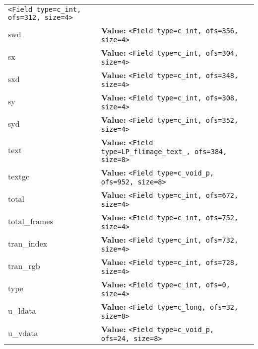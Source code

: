 \begin{longtable}{|p{\varnamewidth}|p{\vardescrwidth}|l}
{\tt {\textless}Field type=c\_int, ofs=312, size=4{\textgreater}}&\\
\cline{1-2}
\raggedright s\-w\-d\- & \raggedright \textbf{Value:} 
{\tt {\textless}Field type=c\_int, ofs=356, size=4{\textgreater}}&\\
\cline{1-2}
\raggedright s\-x\- & \raggedright \textbf{Value:} 
{\tt {\textless}Field type=c\_int, ofs=304, size=4{\textgreater}}&\\
\cline{1-2}
\raggedright s\-x\-d\- & \raggedright \textbf{Value:} 
{\tt {\textless}Field type=c\_int, ofs=348, size=4{\textgreater}}&\\
\cline{1-2}
\raggedright s\-y\- & \raggedright \textbf{Value:} 
{\tt {\textless}Field type=c\_int, ofs=308, size=4{\textgreater}}&\\
\cline{1-2}
\raggedright s\-y\-d\- & \raggedright \textbf{Value:} 
{\tt {\textless}Field type=c\_int, ofs=352, size=4{\textgreater}}&\\
\cline{1-2}
\raggedright t\-e\-x\-t\- & \raggedright \textbf{Value:} 
{\tt {\textless}Field type=LP\_flimage\_text\_, ofs=384, size=8{\textgreater}}&\\
\cline{1-2}
\raggedright t\-e\-x\-t\-g\-c\- & \raggedright \textbf{Value:} 
{\tt {\textless}Field type=c\_void\_p, ofs=952, size=8{\textgreater}}&\\
\cline{1-2}
\raggedright t\-o\-t\-a\-l\- & \raggedright \textbf{Value:} 
{\tt {\textless}Field type=c\_int, ofs=672, size=4{\textgreater}}&\\
\cline{1-2}
\raggedright t\-o\-t\-a\-l\-\_\-f\-r\-a\-m\-e\-s\- & \raggedright \textbf{Value:} 
{\tt {\textless}Field type=c\_int, ofs=752, size=4{\textgreater}}&\\
\cline{1-2}
\raggedright t\-r\-a\-n\-\_\-i\-n\-d\-e\-x\- & \raggedright \textbf{Value:} 
{\tt {\textless}Field type=c\_int, ofs=732, size=4{\textgreater}}&\\
\cline{1-2}
\raggedright t\-r\-a\-n\-\_\-r\-g\-b\- & \raggedright \textbf{Value:} 
{\tt {\textless}Field type=c\_int, ofs=728, size=4{\textgreater}}&\\
\cline{1-2}
\raggedright t\-y\-p\-e\- & \raggedright \textbf{Value:} 
{\tt {\textless}Field type=c\_int, ofs=0, size=4{\textgreater}}&\\
\cline{1-2}
\raggedright u\-\_\-l\-d\-a\-t\-a\- & \raggedright \textbf{Value:} 
{\tt {\textless}Field type=c\_long, ofs=32, size=8{\textgreater}}&\\
\cline{1-2}
\raggedright u\-\_\-v\-d\-a\-t\-a\- & \raggedright \textbf{Value:} 
{\tt {\textless}Field type=c\_void\_p, ofs=24, size=8{\textgreater}}&\\

\end{longtable}

